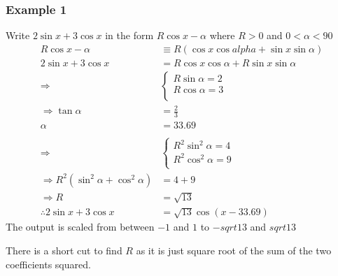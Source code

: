 \documentclass[class=article, crop=false]{standalone}
\begin{document}
\subsubsection*{Example 1}
Write $2 \sin x + 3 \cos x$ in the form $R \cos x - \alpha$ where $R > 0$ and $0 < \alpha < 90$ \\
\begin{align*}
R \cos x - \alpha & \equiv R (\cos x \cos alpha + \sin x \sin \alpha) \\
2 \sin x + 3 \cos x & = R \cos x \cos \alpha + R \sin x \sin \alpha \\ 
\Rightarrow & \begin{cases}
	R \sin \alpha = 2 \\
	R \cos \alpha = 3 \\
	\end{cases} \\
\Rightarrow \tan \alpha & = \frac{2}{3} \\
\alpha & = 33.69 \\
\\
\Rightarrow & \begin{cases}
	R^2 \sin^2 \alpha = 4 \\
	R^2 \cos^2 \alpha = 9 \\
	\end{cases} \\
\Rightarrow R^2 (\sin^2 \alpha + \cos^2 \alpha) & = 4 + 9 \\
\Rightarrow R & = \sqrt{13} \\
\therefore 2 \sin x + 3 \cos x & = \sqrt{13}\cos(x-33.69)
\end{align*}
The output is scaled from between $-1$ and $1$ to $-sqrt{13}$ and $sqrt{13}$

There is a short cut to find $R$ as it is just square root of the sum of the two coefficients squared. 
\end{document}
